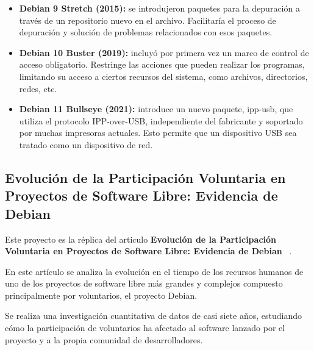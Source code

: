 \documentclass[a4paper, 12pt]{book}
\begin{document}
\begin{itemize}
	\item \textbf {Debian 9 Stretch (2015):} se introdujeron paquetes para la depuración a través de un repositorio nuevo en el archivo. Facilitaría el proceso de depuración y solución de problemas relacionados con esos paquetes.
	\item \textbf {Debian 10 Buster (2019):} incluyó por primera vez un marco de control de acceso obligatorio. Restringe las acciones que pueden realizar los programas, limitando su acceso a ciertos recursos del sistema, como archivos, directorios, redes, etc.
	\item \textbf {Debian 11 Bullseye (2021):} introduce un nuevo paquete, ipp-usb, que utiliza el protocolo IPP-over-USB, independiente del fabricante y soportado por muchas impresoras actuales. Esto permite que un dispositivo USB sea tratado como un dispositivo de red.
	
		
\end{itemize}
	
\subsection{ Evolución de la Participación Voluntaria en Proyectos de Software Libre: Evidencia de Debian}
\label{subsec:articulo debian}

Este proyecto es la réplica del articulo \textbf {Evolución de la Participación Voluntaria en Proyectos de Software Libre:
Evidencia de Debian} ~\cite{robles05:_debian}.

En este 
artículo se analiza la evolución en el tiempo de los recursos humanos de 
uno de los proyectos de software libre más grandes y complejos 
compuesto principalmente por voluntarios, el proyecto Debian.

Se realiza una investigación 
cuantitativa de datos de casi siete años, estudiando cómo la participación 
de voluntarios ha afectado al software lanzado por el proyecto y a la 
propia comunidad de desarrolladores.
\end{document}
